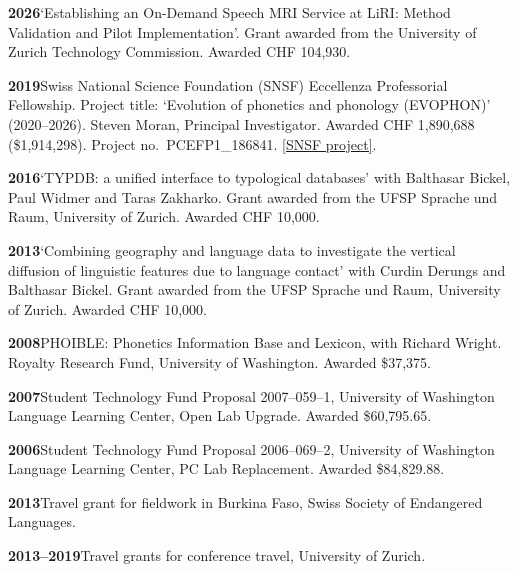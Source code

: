 \documentclass[11pt]{article}
\newcommand{\hangpara}{
 \setlength{\parindent}{0in} %
 \hangindent=0.42in %
}
\begin{document}

\hangpara
{\bf 2026}\hspace{1ex}`Establishing an On-Demand Speech MRI Service at LiRI: Method Validation and Pilot Implementation'. Grant awarded from the University of Zurich Technology Commission. Awarded CHF 104,930.

\vskip 6pt
\hangpara
{\bf 2019}\hspace{1ex}Swiss National Science Foundation (SNSF) Eccellenza Professorial Fellowship. Project title: `Evolution of phonetics and phonology (EVOPHON)' (2020--2026). Steven Moran, Principal Investigator. Awarded CHF 1,890,688 (\$1,914,298). Project no.\ PCEFP1\_186841. \href{https://data.snf.ch/grants/grant/186841}{[SNSF project]}.

\vskip 6pt
\hangpara
{\bf 2016}\hspace{1ex}`TYPDB: a unified interface to typological databases' with Balthasar Bickel, Paul Widmer and Taras Zakharko. Grant awarded from the UFSP Sprache und Raum, University of Zurich. Awarded CHF 10,000.

\vskip 6pt
\hangpara
{\bf 2013}\hspace{1ex}`Combining geography and language data to investigate the vertical diffusion of linguistic features due to language contact' with Curdin Derungs and Balthasar Bickel. Grant awarded from the UFSP Sprache und Raum, University of Zurich. Awarded CHF 10,000.

\vskip 6pt
\hangpara
{\bf 2008}\hspace{1ex}PHOIBLE: Phonetics Information Base and Lexicon, with Richard Wright. Royalty Research Fund, University of Washington. Awarded \$37,375.

\vskip 6pt
\hangpara
{\bf 2007}\hspace{1ex}Student Technology Fund Proposal 2007--059--1, University of Washington Language Learning Center, Open Lab Upgrade. Awarded \$60,795.65.

\vskip 6pt
\hangpara
{\bf 2006}\hspace{1ex}Student Technology Fund Proposal 2006--069--2, University of Washington Language Learning Center, PC Lab Replacement. Awarded \$84,829.88.

\vskip 6pt
\hangpara
{\bf 2013}\hspace{1ex}Travel grant for fieldwork in Burkina Faso, Swiss Society of Endangered Languages.

\vskip 6pt
\hangpara
{\bf 2013--2019}\hspace{1ex}Travel grants for conference travel, University of Zurich.
\end{document}
